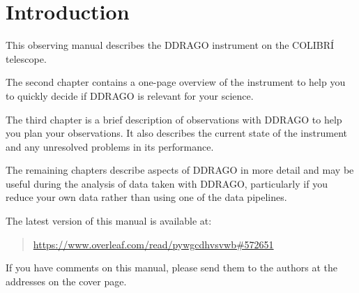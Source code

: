 \chapter{Introduction}

This observing manual describes the DDRAGO instrument on the COLIBRÍ telescope. 

The second chapter contains a one-page overview of the instrument to help you to quickly decide if DDRAGO is relevant for your science. 

The third chapter is a brief description of observations with DDRAGO to help you plan your observations. It also describes the current state of the instrument and any unresolved problems in its performance.

The remaining chapters describe aspects of DDRAGO in more detail and may be useful during the analysis of data taken with DDRAGO, particularly if you reduce your own data rather than using one of the data pipelines.

The latest version of this manual is available at:

\begin{quote}
\url{https://www.overleaf.com/read/pywgcdhvsvwb#572651}
\end{quote}

If you have comments on this manual, please send them to the authors at the addresses on the cover page.
